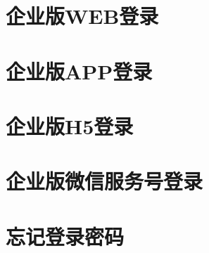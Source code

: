 
\section{企业版WEB登录} 
\label{sec:login_web}


\section{企业版APP登录} 
\label{sec:login_app}


\section{企业版H5登录} 
\label{sec:login_h5}


\section{企业版微信服务号登录} 
\label{sec:login_wx}


\section{忘记登录密码} 
\label{sec:login_passwd}

